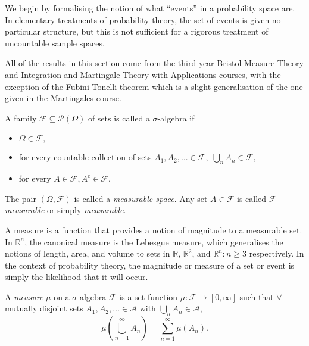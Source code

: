 We begin by formalising the notion of what ``events'' in a probability space are.
In elementary treatments of probability theory, the set of events is given no particular 
structure, but this is not sufficient for a rigorous treatment of uncountable sample 
spaces. 

All of the results in this section come from the third year Bristol Measure Theory and Integration
and Martingale Theory with Applications courses, with the exception of the Fubini-Tonelli
theorem which is a slight generalisation of the one given in the Martingales course.

\begin{definition}
    A family $\mathcal{F}\subseteq\mathcal{P}(\Omega)$ of sets is called a $\sigma$-algebra if 
    \begin{itemize}
        \item $\Omega\in\mathcal{F},$
        \item for every countable collection of sets $A_1,A_2,...\in\mathcal{F},\;\bigcup_{n}A_n\in\mathcal{F},$
        \item for every $A\in\mathcal{F}, A^{\mathrm c}\in\mathcal{F}.$
    \end{itemize}
\end{definition}

\begin{remark}
    The pair $(\Omega,\mathcal{F})$ is called a \emph{measurable space}. Any set $A\in\mathcal{F}$
    is called $\mathcal{F}$-\emph{measurable} or simply \emph{measurable}.
\end{remark}

A measure is a function that provides a notion of magnitude to a measurable set. 
In $\mathbb{R}^n$, the canonical measure is the Lebesgue measure, which generalises the 
notions of length, area, and volume to sets in $\mathbb{R}$, $\mathbb{R}^2$, and $\mathbb{R}^n:n\geq3$
respectively.
In the context of probability theory, the magnitude or measure of a set or event is 
simply the likelihood that it will occur.

\begin{definition}[Measure]
    A \emph{measure} $\mu$ on a $\sigma$-algebra $\mathcal{F}$ is a set function
    $\mu:\mathcal{F}\rightarrow[0,\infty]$ such that $\forall$ mutually disjoint
    sets $A_1,A_2,...\in\mathcal{A}$ with $\bigcup_nA_n\in\mathcal{A},$
    \begin{equation*}
        \mu\left(\bigcup_{n=1}^{\infty}A_n\right)=\sum_{n=1}^{\infty}\mu(A_n).
    \end{equation*}
\end{definition}

